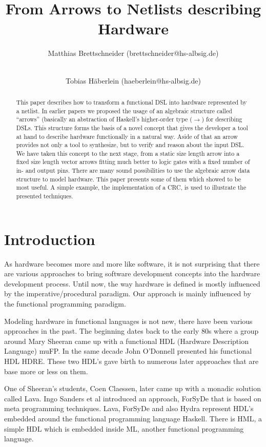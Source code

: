 \documentclass[a4paper]{llncs}
\title{From Arrows to Netlists describing Hardware}
\author{Matthias Brettschneider (brettschneider@hs-albsig.de) \and \\ Tobias H{\"a}berlein (haeberlein@hs-albsig.de)}
\institute{Albstadt-Sigmaringen University}
\begin{document}
\maketitle


\begin{abstract}
This paper describes how to transform a functional DSL into hardware represented by a netlist. In earlier papers we proposed the
usage of an algebraic structure called ``arrows'' (basically an abstraction of Haskell's higher-order type ($\rightarrow$) for describing
DSLs. This structure forms the basis of a novel concept that gives the developer a tool at hand to describe hardware functionally
in a natural way. Aside of that an arrow provides not only a tool to synthesize, but to verify and reason about the input DSL. We
have taken this concept to the next stage, from a static size length arrow into a fixed size length vector arrows fitting much
better to logic gates with a fixed number of in- and output pins. There are many sound possibilities to use the algebraic arrow
data structure to model hardware. This paper presents some of them which showed to be most useful. A simple example, the
implementation of a CRC, is used to illustrate the presented techniques.
\end{abstract}


\section{Introduction}
\label{recent_approaches}
As hardware becomes more and more like software, it is not surprising that there are various approaches to bring software
development concepts into the hardware development process. Until now, the way hardware is defined is mostly influenced by the
imperative/procedural paradigm. Our approach is mainly influenced by the functional programming paradigm.

\par
Modeling hardware in functional languages is not new, there have been various approaches in the past. The beginning dates back to
the early 80s where a group around Mary Sheeran came up with a functional HDL (Hardware Description Language)
muFP\cite{sheeran:muFP}. In the same decade John O'Donnell presented his functional HDL HDRE\cite{hydra:old,donnell}. These two
HDL's gave birth to numerous later approaches that are base more or less on them.

\par
One of Sheeran's students, Coen Claessen, later came up with a monadic solution called Lava\cite{claessen:hardware}. Ingo Sanders
et al introduced an approach, ForSyDe \cite{forsyde:phd,forsyde:ieee} that is based on meta programming techniques. Lava, ForSyDe
and also Hydra \cite{donnell} represent HDL's embedded around the functional programming language Haskell. There is HML\cite{hml},
a simple HDL which is embedded inside ML, another functional programming language.
\end{document}
